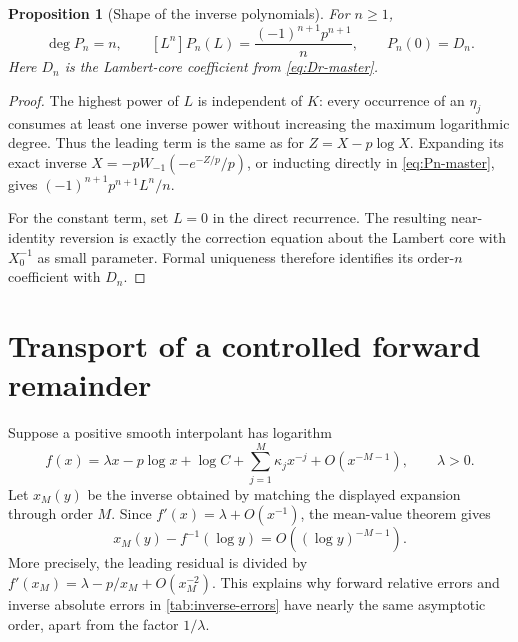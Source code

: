 \documentclass[11pt,a4paper,oneside,openany]{book}
\newtheorem{proposition}[theorem]{Proposition}
\theoremstyle{definition}
\theoremstyle{remark}
\begin{document}
\begin{proposition}[Shape of the inverse polynomials]
For $n\ge1$,
\begin{equation}
 \deg P_n=n,
 \qquad
 [L^n]P_n(L)=\frac{(-1)^{n+1}p^{n+1}}{n},
 \qquad
 P_n(0)=D_n.
 \label{eq:Pn-shape}
\end{equation}
Here $D_n$ is the Lambert-core coefficient from \cref{eq:Dr-master}.
\end{proposition}

\begin{proof}
The highest power of $L$ is independent of $K$: every occurrence of an
$\eta_j$ consumes at least one inverse power without increasing the maximum
logarithmic degree.  Thus the leading term is the same as for
$Z=X-p\log X$.  Expanding its exact inverse
$X=-pW_{-1}(-e^{-Z/p}/p)$, or inducting directly in
\cref{eq:Pn-master}, gives $(-1)^{n+1}p^{n+1}L^n/n$.

For the constant term, set $L=0$ in the direct recurrence.  The resulting
near-identity reversion is exactly the correction equation about the Lambert
core with $X_0^{-1}$ as small parameter.  Formal uniqueness therefore identifies
its order-$n$ coefficient with $D_n$.
\end{proof}

\section{Transport of a controlled forward remainder}
Suppose a positive smooth interpolant has logarithm
\begin{equation}
 f(x)=\lambda x-p\log x+\log C+
 \sum_{j=1}^{M}\kappa_jx^{-j}+O(x^{-M-1}),
 \qquad \lambda>0.
 \label{eq:forward-log-remainder}
\end{equation}
Let $x_M(y)$ be the inverse obtained by matching the displayed expansion through
order $M$.  Since $f'(x)=\lambda+O(x^{-1})$, the mean-value theorem gives
\begin{equation}
 x_M(y)-f^{-1}(\log y)
 =O\!\left((\log y)^{-M-1}\right).
 \label{eq:inverse-remainder-transport}
\end{equation}
More precisely, the leading residual is divided by
$f'(x_M)=\lambda-p/x_M+O(x_M^{-2})$.  This explains why forward relative errors
and inverse absolute errors in \cref{tab:inverse-errors} have nearly the same
asymptotic order, apart from the factor $1/\lambda$.
\end{document}

